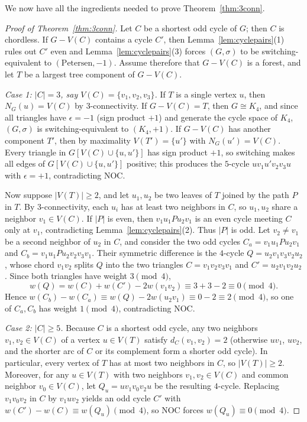 \documentclass[10pt,letterpaper]{article}
\theoremstyle{zetaplain}
\theoremstyle{zetadef}
\theoremstyle{remark}
\numberwithin{equation}{section}
\begin{document}
We now have all the ingredients needed to prove Theorem~\ref{thm:3conn}.

\begin{proof}[Proof of Theorem~\ref{thm:3conn}]
Let $C$ be a shortest odd cycle of $G$; then $C$ is chordless. If $G - V(C)$ contains a cycle $C'$, then Lemma~\ref{lem:cyclepairs}(1) rules out $C'$ even and Lemma~\ref{lem:cyclepairs}(3) forces $(G, \sigma)$ to be switching-equivalent to $(\mathrm{Petersen}, -1)$. Assume therefore that $G - V(C)$ is a forest, and let $T$ be a largest tree component of $G - V(C)$.

\emph{Case 1: $|C| = 3$, say $V(C) = \{v_1, v_2, v_3\}$.} If $T$ is a single vertex $u$, then $N_G(u) = V(C)$ by $3$-connectivity. If $G - V(C) = T$, then $G \cong K_4$, and since all triangles have $\epsilon = -1$ (sign product $+1$) and generate the cycle space of $K_4$, $(G, \sigma)$ is switching-equivalent to $(K_4, +1)$. If $G - V(C)$ has another component $T'$, then by maximality $V(T') = \{u'\}$ with $N_G(u') = V(C)$. Every triangle in $G[V(C) \cup \{u, u'\}]$ has sign product $+1$, so switching makes all edges of $G[V(C) \cup \{u, u'\}]$ positive; this produces the $5$-cycle $u v_1 u' v_2 v_3 u$ with $\epsilon = +1$, contradicting NOC.

Now suppose $|V(T)| \ge 2$, and let $u_1, u_2$ be two leaves of $T$ joined by the path $P$ in $T$. By $3$-connectivity, each $u_i$ has at least two neighbors in $C$, so $u_1, u_2$ share a neighbor $v_1 \in V(C)$. If $|P|$ is even, then $v_1 u_1 P u_2 v_1$ is an even cycle meeting $C$ only at $v_1$, contradicting Lemma~\ref{lem:cyclepairs}(2). Thus $|P|$ is odd. Let $v_2 \ne v_1$ be a second neighbor of $u_2$ in $C$, and consider the two odd cycles $C_a = v_1 u_1 P u_2 v_1$ and $C_b = v_1 u_1 P u_2 v_2 v_3 v_1$. Their symmetric difference is the $4$-cycle $Q = u_2 v_1 v_3 v_2 u_2$, whose chord $v_1 v_2$ splits $Q$ into the two triangles $C = v_1 v_2 v_3 v_1$ and $C' = u_2 v_1 v_2 u_2$. Since both triangles have weight $3 \pmod 4$,
\[
  w(Q) = w(C) + w(C') - 2w(v_1 v_2) \equiv 3 + 3 - 2 \equiv 0 \pmod 4.
\]
Hence $w(C_b) - w(C_a) \equiv w(Q) - 2w(u_2 v_1) \equiv 0 - 2 \equiv 2 \pmod 4$, so one of $C_a, C_b$ has weight $1 \pmod 4$, contradicting NOC.

\emph{Case 2: $|C| \ge 5$.} Because $C$ is a shortest odd cycle, any two neighbors $v_1, v_2 \in V(C)$ of a vertex $u \in V(T)$ satisfy $d_C(v_1, v_2) = 2$ (otherwise $u v_1$, $u v_2$, and the shorter arc of $C$ or its complement form a shorter odd cycle). In particular, every vertex of $T$ has at most two neighbors in $C$, so $|V(T)| \ge 2$. Moreover, for any $u \in V(T)$ with two neighbors $v_1, v_2 \in V(C)$ and common neighbor $v_0 \in V(C)$, let $Q_u = u v_1 v_0 v_2 u$ be the resulting $4$-cycle. Replacing $v_1 v_0 v_2$ in $C$ by $v_1 u v_2$ yields an odd cycle $C'$ with $w(C') - w(C) \equiv w(Q_u) \pmod 4$, so NOC forces $w(Q_u) \equiv 0 \pmod 4$.


\end{proof}
\end{document}
